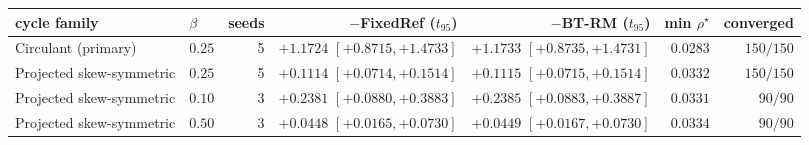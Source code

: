 \begin{tabular}{llrrrrr}
\toprule
cycle family & $\beta$ & seeds & \NBPO{}$-$FixedRef ($t_{95}$) & \NBPO{}$-$BT-RM ($t_{95}$) & min $\rho^\star$ & converged\\
\midrule
Circulant (primary) & $0.25$ & 5 & $+1.1724$ $[+0.8715,+1.4733]$ & $+1.1733$ $[+0.8735,+1.4731]$ & $0.0283$ & $150/150$\\
Projected skew-symmetric & $0.25$ & 5 & $+0.1114$ $[+0.0714,+0.1514]$ & $+0.1115$ $[+0.0715,+0.1514]$ & $0.0332$ & $150/150$\\
Projected skew-symmetric & $0.10$ & 3 & $+0.2381$ $[+0.0880,+0.3883]$ & $+0.2385$ $[+0.0883,+0.3887]$ & $0.0331$ & $90/90$\\
Projected skew-symmetric & $0.50$ & 3 & $+0.0448$ $[+0.0165,+0.0730]$ & $+0.0449$ $[+0.0167,+0.0730]$ & $0.0334$ & $90/90$\\
\bottomrule
\end{tabular}
